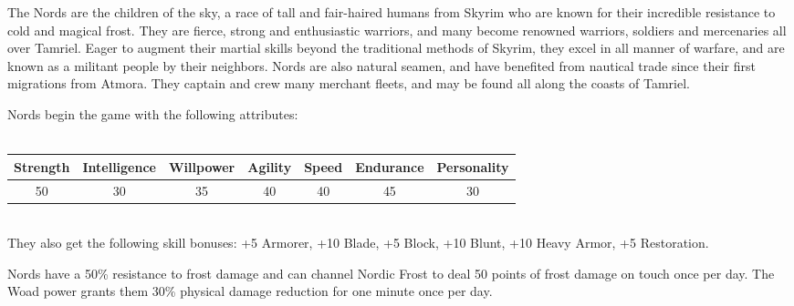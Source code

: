 \documentclass[12pt]{book}
\begin{document}
The Nords are the children of the sky, a race of tall and fair-haired humans from Skyrim who are known for their incredible resistance to cold and magical frost. They are fierce, strong and enthusiastic warriors, and many become renowned warriors, soldiers and mercenaries all over Tamriel. Eager to augment their martial skills beyond the traditional methods of Skyrim, they excel in all manner of warfare, and are known as a militant people by their neighbors. Nords are also natural seamen, and have benefited from nautical trade since their first migrations from Atmora. They captain and crew many merchant fleets, and may be found all along the coasts of Tamriel.

Nords begin the game with the following attributes:\\~\\
\begin{tabular}{|c|c|c|c|c|c|c|}
\hline
Strength & Intelligence & Willpower & Agility & Speed & Endurance & Personality\\ \hline
50 & 30 & 35 & 40 & 40 & 45 & 30\\ \hline

\end{tabular}\\

They also get the following skill bonuses: +5 Armorer, +10 Blade, +5 Block, +10 Blunt, +10 Heavy Armor, +5 Restoration.

Nords have a 50\% resistance to frost damage and can channel Nordic Frost to deal 50 points of frost damage on touch once per day. The Woad power grants them 30\% physical damage reduction for one minute once per day.\\
\end{document}
